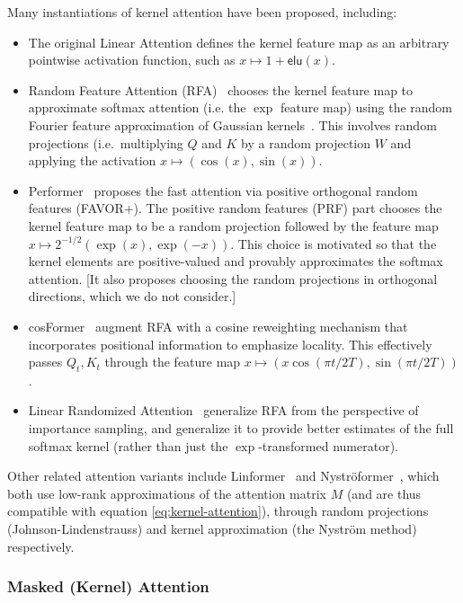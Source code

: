 Many instantiations of kernel attention have been proposed, including:
\begin{itemize}
  \item The original Linear Attention \citep{katharopoulos2020transformers} defines the kernel feature map as an arbitrary pointwise activation function, such as $x \mapsto 1+\mathsf{elu}(x)$.
  \item Random Feature Attention (RFA)~\citep{peng2021random} chooses the kernel feature map to approximate softmax attention (i.e. the $\exp$ feature map) using the random Fourier feature approximation of Gaussian kernels~\citep{rahimi2007random}. This involves random projections (i.e.\ multiplying $Q$ and $K$ by a random projection $W$ and applying the activation $x \mapsto (\cos(x), \sin(x))$.
%
  \item Performer~\citep{choromanski2021rethinking} proposes the fast attention via positive orthogonal random features (FAVOR+).
    The positive random features (PRF) part chooses the kernel feature map to be a random projection followed by the feature map $x \mapsto 2^{-1/2}(\exp(x), \exp(-x))$.
    This choice is motivated so that the kernel elements are positive-valued and provably approximates the softmax attention. [It also proposes choosing the random projections in orthogonal directions, which we do not consider.]
  \item cosFormer~\citep{qin2022cosformer} augment RFA with a cosine reweighting mechanism that incorporates positional information to emphasize locality.
    This effectively passes $Q_t,K_t$ through the feature map $x \mapsto (x \cos(\pi t / 2T), \sin(\pi t / 2T))$.
  \item Linear Randomized Attention~\citep{zheng2022linear} generalize RFA from the perspective of importance sampling, and generalize it to provide better estimates of the full softmax kernel (rather than just the $\exp$-transformed numerator).
\end{itemize}

Other related attention variants include Linformer~\citep{wang2020linformer} and Nystr\"{o}former~\citep{xiong2021nystromformer}, which both use low-rank approximations of the attention matrix $M$ (and are thus compatible with equation \eqref{eq:kernel-attention}), through random projections (Johnson-Lindenstrauss) and kernel approximation (the Nystr\"{o}m method) respectively.


\subsubsection{Masked (Kernel) Attention}

